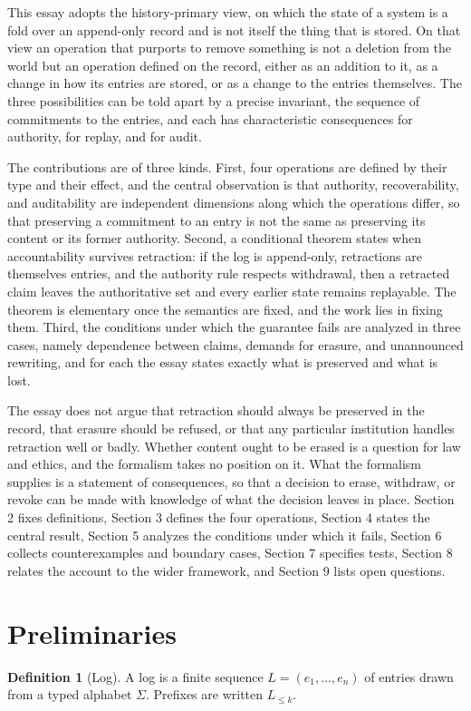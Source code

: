 \documentclass[11pt]{article}
\theoremstyle{plain}
\theoremstyle{definition}
\newtheorem{definition}{Definition}
\theoremstyle{remark}
\begin{document}
This essay adopts the history-primary view, on which the state of a system is a fold over an append-only record and is not itself the thing that is stored. On that view an operation that purports to remove something is not a deletion from the world but an operation defined on the record, either as an addition to it, as a change in how its entries are stored, or as a change to the entries themselves. The three possibilities can be told apart by a precise invariant, the sequence of commitments to the entries, and each has characteristic consequences for authority, for replay, and for audit.

The contributions are of three kinds. First, four operations are defined by their type and their effect, and the central observation is that authority, recoverability, and auditability are independent dimensions along which the operations differ, so that preserving a commitment to an entry is not the same as preserving its content or its former authority. Second, a conditional theorem states when accountability survives retraction: if the log is append-only, retractions are themselves entries, and the authority rule respects withdrawal, then a retracted claim leaves the authoritative set and every earlier state remains replayable. The theorem is elementary once the semantics are fixed, and the work lies in fixing them. Third, the conditions under which the guarantee fails are analyzed in three cases, namely dependence between claims, demands for erasure, and unannounced rewriting, and for each the essay states exactly what is preserved and what is lost.

The essay does not argue that retraction should always be preserved in the record, that erasure should be refused, or that any particular institution handles retraction well or badly. Whether content ought to be erased is a question for law and ethics, and the formalism takes no position on it. What the formalism supplies is a statement of consequences, so that a decision to erase, withdraw, or revoke can be made with knowledge of what the decision leaves in place. Section 2 fixes definitions, Section 3 defines the four operations, Section 4 states the central result, Section 5 analyzes the conditions under which it fails, Section 6 collects counterexamples and boundary cases, Section 7 specifies tests, Section 8 relates the account to the wider framework, and Section 9 lists open questions.

\section{Preliminaries}
\begin{definition}[Log]
A log is a finite sequence $L = (e_1, \dots, e_n)$ of entries drawn from a typed alphabet $\Sigma$. Prefixes are written $L_{\le k}$.
\end{definition}
\end{document}
